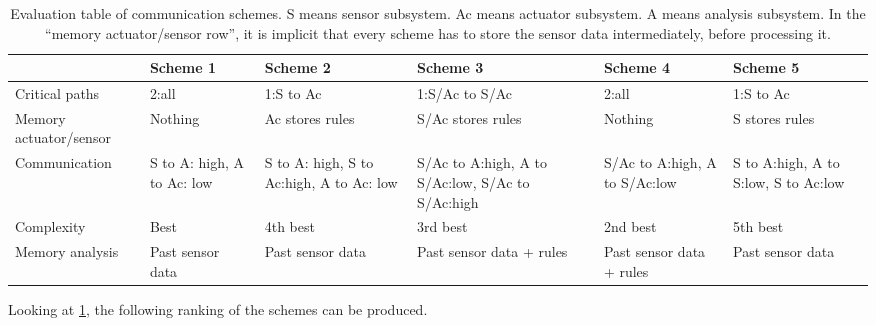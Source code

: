 \begin{table}[htbp]
\centering
\begin{adjustbox}{angle=90}
\begin{tabular}{m{7em} m{7em} m{7em} m{7em} m{8em} m{8em}}
\toprule
                       & Scheme 1                                          & Scheme 2                                 & Scheme 3                                         & Scheme 4                      & Scheme 5                             \\ \midrule
Critical paths         & 2:all                                             & 1:S to Ac                                & 1:S/Ac to S/Ac                                   & 2:all                         & 1:S to Ac                            \\ \midrule
Memory actuator/sensor & Nothing                                           & Ac stores rules                          & S/Ac stores rules                                & Nothing                       & S stores rules                       \\ \midrule
Communication          & S to A: high, A to Ac: low                        & S to A: high, S to Ac:high, A to Ac: low & S/Ac to A:high, A to S/Ac:low, S/Ac to S/Ac:high & S/Ac to A:high, A to S/Ac:low & S to A:high, A to S:low, S to Ac:low \\ \midrule
Complexity             & Best                                              & 4th best                                 & 3rd best                                         & 2nd best                      & 5th best                             \\ \midrule
Memory analysis        & Past sensor data                                  & Past sensor data                         & Past sensor data + rules                         & Past sensor data + rules      & Past sensor data                     \\ \bottomrule
\end{tabular}
\end{adjustbox}
\caption[Evaluation table]{Evaluation table of communication schemes. S means sensor subsystem. Ac means actuator subsystem. A means analysis subsystem. In the \enquote{memory actuator/sensor row}, it is implicit that every scheme has to store the sensor data intermediately, before processing it.}\label{tab:scheme_choice}
\end{table}

Looking at \cref{tab:scheme_choice}, the following ranking of the schemes can be produced. 

